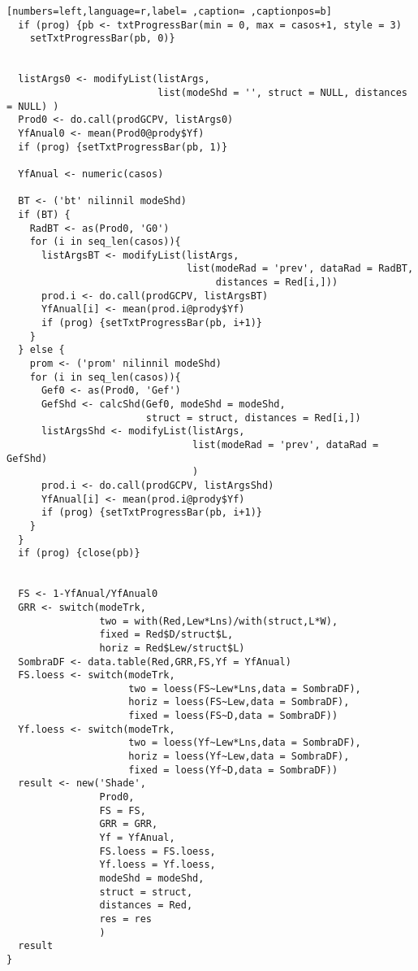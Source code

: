 \begin{lstlisting}[numbers=left,language=r,label= ,caption= ,captionpos=b]
  if (prog) {pb <- txtProgressBar(min = 0, max = casos+1, style = 3)
    setTxtProgressBar(pb, 0)}


  listArgs0 <- modifyList(listArgs,
                          list(modeShd = '', struct = NULL, distances = NULL) )
  Prod0 <- do.call(prodGCPV, listArgs0)
  YfAnual0 <- mean(Prod0@prody$Yf) 
  if (prog) {setTxtProgressBar(pb, 1)}

  YfAnual <- numeric(casos) 

  BT <- ('bt' nilinnil modeShd)
  if (BT) { 
    RadBT <- as(Prod0, 'G0')
    for (i in seq_len(casos)){
      listArgsBT <- modifyList(listArgs,
                               list(modeRad = 'prev', dataRad = RadBT,
                                    distances = Red[i,]))
      prod.i <- do.call(prodGCPV, listArgsBT)
      YfAnual[i] <- mean(prod.i@prody$Yf)
      if (prog) {setTxtProgressBar(pb, i+1)}
    }
  } else {
    prom <- ('prom' nilinnil modeShd)
    for (i in seq_len(casos)){
      Gef0 <- as(Prod0, 'Gef')
      GefShd <- calcShd(Gef0, modeShd = modeShd,
                        struct = struct, distances = Red[i,])
      listArgsShd <- modifyList(listArgs,
                                list(modeRad = 'prev', dataRad = GefShd)
                                )
      prod.i <- do.call(prodGCPV, listArgsShd)
      YfAnual[i] <- mean(prod.i@prody$Yf)
      if (prog) {setTxtProgressBar(pb, i+1)}
    }
  }
  if (prog) {close(pb)}


  FS <- 1-YfAnual/YfAnual0
  GRR <- switch(modeTrk,
                two = with(Red,Lew*Lns)/with(struct,L*W),
                fixed = Red$D/struct$L,
                horiz = Red$Lew/struct$L)
  SombraDF <- data.table(Red,GRR,FS,Yf = YfAnual)
  FS.loess <- switch(modeTrk,
                     two = loess(FS~Lew*Lns,data = SombraDF),
                     horiz = loess(FS~Lew,data = SombraDF),
                     fixed = loess(FS~D,data = SombraDF))
  Yf.loess <- switch(modeTrk,
                     two = loess(Yf~Lew*Lns,data = SombraDF),
                     horiz = loess(Yf~Lew,data = SombraDF),
                     fixed = loess(Yf~D,data = SombraDF))
  result <- new('Shade',
                Prod0, 
                FS = FS,
                GRR = GRR,
                Yf = YfAnual,
                FS.loess = FS.loess,
                Yf.loess = Yf.loess,
                modeShd = modeShd,
                struct = struct,
                distances = Red,
                res = res
                )
  result
}
\end{lstlisting}
